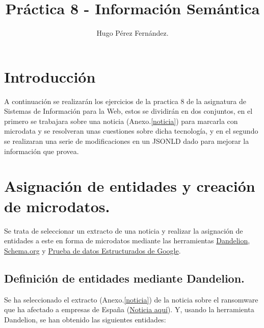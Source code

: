 \documentclass[spanish]{llncs}   %
\begin{document}
\title{Práctica 8 - Información Semántica}

\author{Hugo Pérez Fernández.  
}
\maketitle              

\section{Introducción}

A continuación se realizarán los ejercicios de la practica 8 de la asignatura de Sistemas de Información para la Web, 
estos se dividirán en dos conjuntos, en el primero se trabajara sobre una noticia (Anexo.\ref{noticia}) para marcarla con 
microdata y se resolveran unas cuestiones sobre dicha tecnología, y en el segundo se realizaran una serie de modificaciones 
en un JSONLD dado para mejorar la información que provea.

\section{Asignación de entidades y creación de microdatos.}

Se trata de seleccionar un extracto de una noticia y realizar la asignación de entidades a este en forma de microdatos mediante las 
herramientas \href{https://dandelion.eu/semantic-text/entity-extraction-demo/}{Dandelion}, 
\href{https://schema.org/docs/schemas.html}{Schema.org} y 
\href{https://search.google.com/structured-data/testing-tool/u/0/}{Prueba de datos Estructurados de Google}.

\subsection{Definición de entidades mediante Dandelion.}

Se ha seleccionado el extracto (Anexo.\ref{noticia}) de la noticia sobre el ransomware que 
ha afectado a empresas de España 
(\href{https://www.elconfidencial.com/tecnologia/2019-11-04/everis-la-ser-ciberataque-ransomware_2312019/}{Noticia aquí}).
Y, usando la herramienta Dandelion, 
se han obtenido las siguientes entidades:
\end{document}
